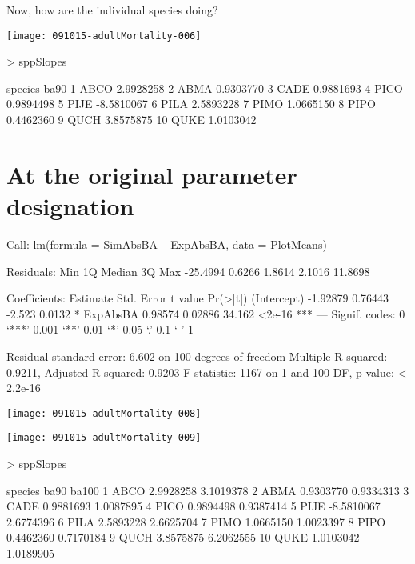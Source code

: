 \documentclass{article}
\begin{document}
Now, how are the individual species doing?

\texttt{[image: 091015-adultMortality-006]}
\begin{Schunk}
\begin{Sinput}
>   sppSlopes
\end{Sinput}
\begin{Soutput}
   species       ba90
1     ABCO  2.9928258
2     ABMA  0.9303770
3     CADE  0.9881693
4     PICO  0.9894498
5     PIJE -8.5810067
6     PILA  2.5893228
7     PIMO  1.0665150
8     PIPO  0.4462360
9     QUCH  3.8575875
10    QUKE  1.0103042
\end{Soutput}
\end{Schunk}


\newpage
\section{At the original parameter designation}
\begin{Schunk}
\begin{Soutput}
Call:
lm(formula = SimAbsBA ~ ExpAbsBA, data = PlotMeans)

Residuals:
     Min       1Q   Median       3Q      Max 
-25.4994   0.6266   1.8614   2.1016  11.8698 

Coefficients:
            Estimate Std. Error t value Pr(>|t|)    
(Intercept) -1.92879    0.76443  -2.523   0.0132 *  
ExpAbsBA     0.98574    0.02886  34.162   <2e-16 ***
---
Signif. codes:  0 ‘***’ 0.001 ‘**’ 0.01 ‘*’ 0.05 ‘.’ 0.1 ‘ ’ 1

Residual standard error: 6.602 on 100 degrees of freedom
Multiple R-squared:  0.9211,	Adjusted R-squared:  0.9203 
F-statistic:  1167 on 1 and 100 DF,  p-value: < 2.2e-16
\end{Soutput}
\end{Schunk}
\texttt{[image: 091015-adultMortality-008]}

\texttt{[image: 091015-adultMortality-009]}
\begin{Schunk}
\begin{Sinput}
>   sppSlopes
\end{Sinput}
\begin{Soutput}
   species       ba90     ba100
1     ABCO  2.9928258 3.1019378
2     ABMA  0.9303770 0.9334313
3     CADE  0.9881693 1.0087895
4     PICO  0.9894498 0.9387414
5     PIJE -8.5810067 2.6774396
6     PILA  2.5893228 2.6625704
7     PIMO  1.0665150 1.0023397
8     PIPO  0.4462360 0.7170184
9     QUCH  3.8575875 6.2062555
10    QUKE  1.0103042 1.0189905
\end{Soutput}
\end{Schunk}
\end{document}
